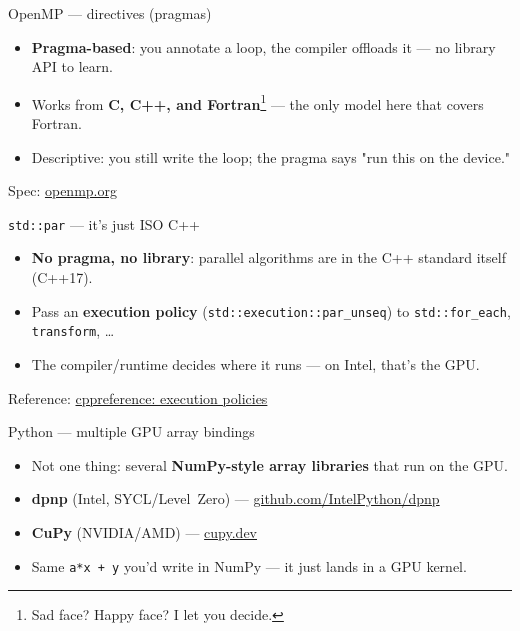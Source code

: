 \begin{frame}{OpenMP --- directives (pragmas)}
\begin{itemize}
  \item \textbf{Pragma-based}: you annotate a loop, the compiler offloads it ---
        no library API to learn.
  \item Works from \textbf{C, C++, and Fortran}\footnote{Sad face? Happy face? I
        let you decide.} --- the only model here that covers Fortran.
  \item Descriptive: you still write the loop; the pragma says "run this on the
        device."
\end{itemize}
\vfill
{\footnotesize Spec: \href{https://www.openmp.org}{openmp.org}}
\end{frame}

\begin{frame}{\texttt{std::par} --- it's just ISO C++}
\begin{itemize}
  \item \textbf{No pragma, no library}: parallel algorithms are in the C++
        standard itself (C++17).
  \item Pass an \textbf{execution policy} (\texttt{std::execution::par\_unseq})
        to \texttt{std::for\_each}, \texttt{transform}, \ldots
  \item The compiler/runtime decides where it runs --- on Intel, that's the GPU.
\end{itemize}
\vfill
{\footnotesize Reference:
\href{https://en.cppreference.com/w/cpp/algorithm/execution_policy_tag}{cppreference: execution policies}}
\end{frame}

\begin{frame}{Python --- multiple GPU array bindings}
\begin{itemize}
  \item Not one thing: several \textbf{NumPy-style array libraries} that run on the GPU.
  \item \textbf{dpnp} (Intel, SYCL/Level~Zero) ---
        \href{https://github.com/IntelPython/dpnp}{github.com/IntelPython/dpnp}
  \item \textbf{CuPy} (NVIDIA/AMD) ---
        \href{https://cupy.dev}{cupy.dev}
  \item Same \texttt{a*x + y} you'd write in NumPy --- it just lands in a GPU kernel.
\end{itemize}
\end{frame}

